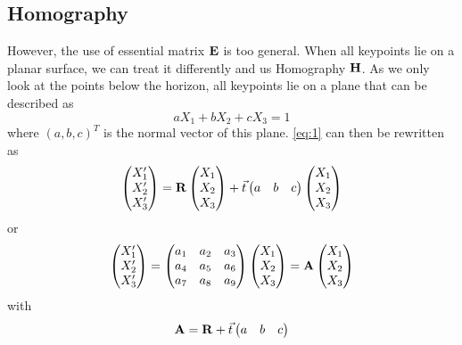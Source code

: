 \subsection{Homography}

However, the use of essential matrix $\mathbf{E}$ is too general. When all keypoints lie on a planar surface, we can treat it differently and us Homography $\mathbf{H}$. As we only look at the points below the horizon, all keypoints lie on a plane that can be described as
\begin{equation}
    aX_1 + bX_2 + cX_3 = 1
\end{equation}
where $(a, b, c)^T$ is the normal vector of this plane. \autoref{eq:1} can then be rewritten as 
\begin{equation}
    \begin{pmatrix}
        X_1' \\
        X_2' \\
        X_3'
    \end{pmatrix} = \mathbf{R}
    \begin{pmatrix}
        X_1 \\
        X_2 \\
        X_3
    \end{pmatrix} + \vec t
    \begin{pmatrix}
        a & b & c
    \end{pmatrix}
    \begin{pmatrix}
        X_1 \\
        X_2 \\
        X_3
    \end{pmatrix}
\end{equation}
or
\begin{equation}
    \begin{pmatrix}
        X_1' \\
        X_2' \\
        X_3'
    \end{pmatrix} =
    \begin{pmatrix}
        a_1 & a_2 & a_3 \\
        a_4 & a_5 & a_6 \\
        a_7 & a_8 & a_9 \\
    \end{pmatrix}
    \begin{pmatrix}
        X_1 \\
        X_2 \\
        X_3
    \end{pmatrix} = \mathbf{A}
    \begin{pmatrix}
        X_1 \\
        X_2 \\
        X_3
    \end{pmatrix}
\end{equation}
with
\begin{equation} \label{eq:matrixA}
    \mathbf{A} = \mathbf{R} + \vec t
    \begin{pmatrix}
        a & b & c
    \end{pmatrix}
\end{equation}


